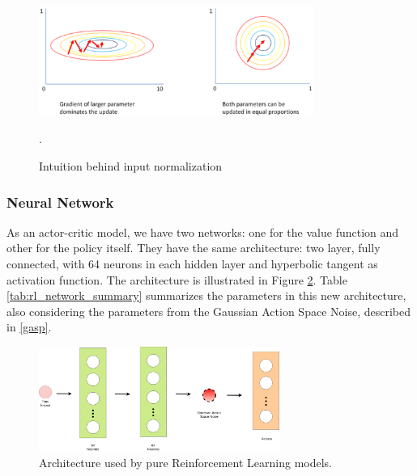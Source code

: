 \begin{figure}[!htbp]
	\centering
	\includegraphics[width=0.8\textwidth]{Cap5/inputnorm.eps}
	\caption{Intuition behind input normalization \cite{inputnormalization}}.
	\label{inputnormfig}
\end{figure}

\subsubsection{Neural Network}
As an actor-critic model, we have two networks: one for the value function and other for the policy itself. They have the same architecture: two layer, fully connected, with 64 neurons in each hidden layer and hyperbolic tangent as activation function. The architecture is illustrated in Figure \ref{rlnetwork}. Table \ref{tab:rl_network_summary} summarizes the parameters in this new architecture, also considering the parameters from the Gaussian Action Space Noise, described in \ref{gasp}.

\begin{figure}[!htbp]
	\centering
	\includegraphics[width=0.7\textwidth]{Cap5/rlnetwork.eps}
	\caption{Architecture used by pure Reinforcement Learning models.}
	\label{rlnetwork}
\end{figure}

